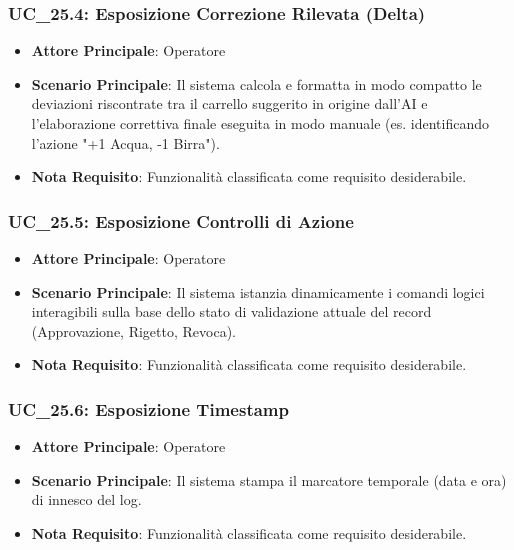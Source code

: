 \subsubsection{UC\_25.4: Esposizione Correzione Rilevata (Delta)}
\label{uc_25.4}
\begin{itemize}
    \item \textbf{Attore Principale}: Operatore
    \item \textbf{Scenario Principale}: Il sistema calcola e formatta in modo compatto le deviazioni riscontrate tra il carrello suggerito in origine dall'AI e l'elaborazione correttiva finale eseguita in modo manuale (es. identificando l'azione "+1 Acqua, -1 Birra").
    \item \textbf{Nota Requisito}: Funzionalità classificata come requisito desiderabile.
\end{itemize}

\subsubsection{UC\_25.5: Esposizione Controlli di Azione}
\label{uc_25.5}
\begin{itemize}
    \item \textbf{Attore Principale}: Operatore
    \item \textbf{Scenario Principale}: Il sistema istanzia dinamicamente i comandi logici interagibili sulla base dello stato di validazione attuale del record (Approvazione, Rigetto, Revoca).
    \item \textbf{Nota Requisito}: Funzionalità classificata come requisito desiderabile.
\end{itemize}

\subsubsection{UC\_25.6: Esposizione Timestamp}
\label{uc_25.6}
\begin{itemize}
    \item \textbf{Attore Principale}: Operatore
    \item \textbf{Scenario Principale}: Il sistema stampa il marcatore temporale (data e ora) di innesco del log.
    \item \textbf{Nota Requisito}: Funzionalità classificata come requisito desiderabile.
\end{itemize}



